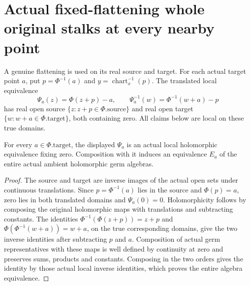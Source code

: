 \section{Actual fixed-flattening whole original stalks at every nearby point}

A genuine flattening is used on its real source and target. For each
actual target point $a$, put $p=\Phi^{-1}(a)$ and
$y=\operatorname{chart}_x^{-1}(p)$. The translated local equivalence
\[
 \Psi_a(z)=\Phi(z+p)-a,\qquad
 \Psi_a^{-1}(w)=\Phi^{-1}(w+a)-p
\]
has real open source $\{z:z+p\in\Phi.\mathrm{source}\}$ and real open
target $\{w:w+a\in\Phi.\mathrm{target}\}$, both containing zero.
All claims below are local on these true domains.

\begin{lemma}
\label{hir:nonlinear-nearby-actual-germ-equivalence}
\leanok
For every $a\in\Phi.\mathrm{target}$, the displayed $\Psi_a$ is an
actual local holomorphic equivalence fixing zero. Composition with it
induces an equivalence $E_a$ of the entire actual ambient holomorphic
germ algebras.
\end{lemma}
\begin{proof}
The source and target are inverse images of the actual open sets under
continuous translations. Since $p=\Phi^{-1}(a)$ lies in the source and
$\Phi(p)=a$, zero lies in both translated domains and $\Psi_a(0)=0$.
Holomorphicity follows by composing the original holomorphic maps with
translations and subtracting constants. The identities
$\Phi^{-1}(\Phi(z+p))=z+p$ and
$\Phi(\Phi^{-1}(w+a))=w+a$, on the true corresponding domains,
give the two inverse identities after subtracting $p$ and $a$.
Composition of actual germ representatives with these maps is well
defined by continuity at zero and preserves sums, products and
constants. Composing in the two orders gives the identity by those
actual local inverse identities, which proves the entire algebra
equivalence.
\end{proof}

